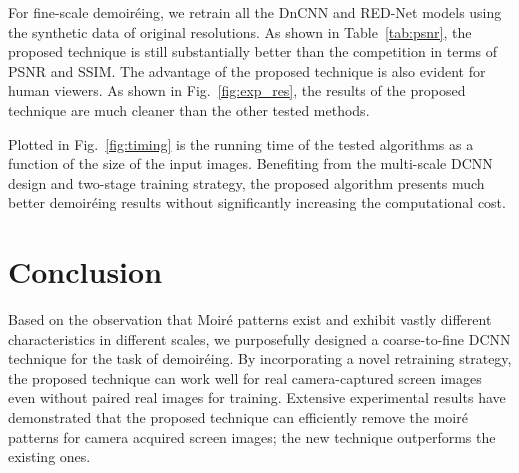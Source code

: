 \documentclass[10pt,twocolumn,letterpaper]{article}
\begin{document}
For fine-scale demoir\'eing, we retrain all the DnCNN and RED-Net
models using the synthetic data of original resolutions.  As shown in
Table~\ref{tab:psnr}, the proposed technique is still substantially
better than the competition in terms of PSNR and SSIM.  The advantage
of the proposed technique is also evident for human viewers.  As shown
in Fig.~\ref{fig:exp_res}, the results of the proposed technique are
much cleaner than the other tested methods.


Plotted in Fig.~\ref{fig:timing} is the running time of the tested
algorithms as a function of the size of the input images.  Benefiting
from the multi-scale DCNN design and two-stage training strategy, the
proposed algorithm presents much better demoir\'eing results without
significantly increasing the computational cost.

\section{Conclusion}
\label{sec:conclusion}

Based on the observation that Moir\'e patterns exist and exhibit
vastly different characteristics in different scales, we purposefully
designed a coarse-to-fine DCNN technique for the task of demoir\'eing.
By incorporating a novel retraining strategy, the proposed technique
can work well for real camera-captured screen images even without
paired real images for training.  Extensive experimental results have
demonstrated that the proposed technique can efficiently remove the
moir\'e patterns for camera acquired screen images; the new technique
outperforms the existing ones.



\end{document}
